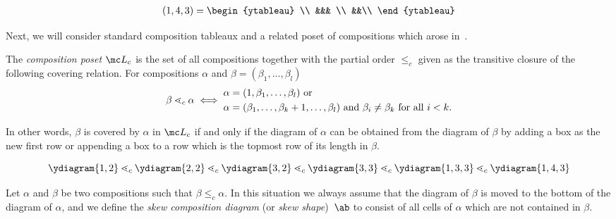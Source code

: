 \begin{exam}
	\begin{align*}
		(1,4,3) = 
		\begin{ytableau} 
		 \\
			&&& \\
			&&\\
		\end{ytableau}
	\end{align*}
\end{exam}

Next, we will consider standard composition tableaux and a related poset of compositions which arose in~\cite{Bessenrodt2011}.

\begin{defi}
	The \emph{composition poset} $\mc L_c$ is the set of all compositions together with the partial order $\leq_c$ given as the transitive closure of the following covering relation. For compositions $\alpha$ and $\beta = ( \beta_1, \ldots, \beta_l)$
	\begin{equation*}
		 \beta \lessdot_c \alpha \iff \begin{aligned}
		 \alpha &= (1, \beta_1, \ldots, \beta_l) \text{ or}\\
		 \alpha &= ( \beta_1, \ldots, \beta_k +1 , \ldots, \beta_l) \text{ and $ \beta_i \neq \beta_k$ for all $i<k$.}
		\end{aligned} 
	\end{equation*}	
\end{defi} 

In other words, $\beta$ is covered by $\alpha$ in $\mc L_c$ if and only if the diagram of $\alpha$ can be obtained from the diagram of $\beta$ by adding a box as the new first row or appending a box to a row which is the topmost row of its length in $\beta$.

\begin{exam}
	\label{exa:chain_in_composition_poset}
	\[	
		\ydiagram{1,2} \lessdot_c 
		\ydiagram{2,2} \lessdot_c 
		\ydiagram{3,2} \lessdot_c 
		\ydiagram{3,3} \lessdot_c 
		\ydiagram{1,3,3} \lessdot_c
		\ydiagram{1,4,3} 
	\]
\end{exam}

Let $\alpha$ and $\beta$ be two compositions such that $\beta \leq_c \alpha$. In this situation we always assume that the diagram of $\beta$ is moved to the bottom of the diagram of $\alpha$, and we define the \emph{skew composition diagram} (or \emph{skew shape})~$\ab$ to consist of all cells of $\alpha$ which are not contained in $\beta$.

